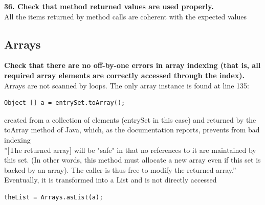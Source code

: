 \documentclass{article}
\begin{document}
\begin{flushleft}
\textbf{36. Check that method returned values are used properly.}\\
\vspace{0.5cm}
All the items returned by method calls are coherent with the expected values \\
\vspace{0.5cm}




\subsection{Arrays}
\textbf{Check that there are no off-by-one errors in array indexing (that is, all required array elements are correctly accessed through the index).}\\
\vspace{0.5cm}
Arrays are not scanned by loops. The only array instance is found at   line 135:\\
\vspace{0.5cm}
\begin{lstlisting}
Object [] a = entrySet.toArray();       
\end{lstlisting}
\vspace{0.5cm}
created from a collection of elements (entrySet in this case) and returned  by the toArray method of Java, which, as the documentation reports, prevents from bad indexing\\
\vspace{0.5cm}
''[The returned array] will be "safe" in that no references to it are maintained by this set. (In other words, this method must allocate a new array even if this set is backed by an array). The caller is thus free to modify the returned array.''\\
\vspace{0.5cm}
 Eventually, it is transformed into a List and is not directly accessed \\
 \vspace{0.5cm}    
 \begin{lstlisting}                 
theList = Arrays.asList(a);
\end{lstlisting}
\vspace{0.5cm}


\end{flushleft}
\end{document}
